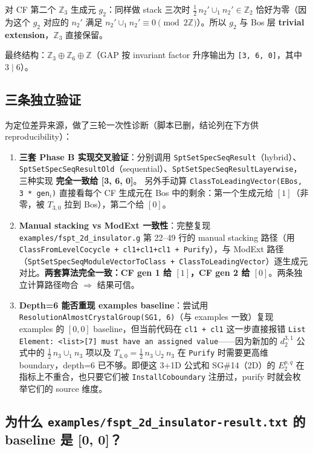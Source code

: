 \documentclass[a4paper,fontset=ubuntu,12pt]{ctexart}
\newcommand{\ZZ}{\mathbb{Z}}
\begin{document}
对 CF 第二个 $\ZZ_3$ 生成元 $g_2$：同样做 stack 三次时 $\frac{1}{2}\, n_2' \cup_1 n_2' \in \ZZ_2$ 恰好为零（因为这个 $g_2$ 对应的 $n_2'$ 满足 $n_2' \cup_1 n_2' \equiv 0 \pmod{2 \mathbb{Z}}$）。所以 $g_2$ 与 Bos 层 \textbf{trivial extension}，$\ZZ_3$ 直接保留。

最终结构：$\boxed{\ZZ_3 \oplus \ZZ_6 \oplus \ZZ}$（GAP 按 invariant factor 升序输出为 \texttt{[3, 6, 0]}，其中 $3 \mid 6$）。

\subsection{三条独立验证}

为定位差异来源，做了三轮一次性诊断（脚本已删，结论列在下方供 reproducibility）：
\begin{enumerate}
\item \textbf{三套 Phase B 实现交叉验证}：分别调用 \texttt{SptSetSpecSeqResult}（hybrid）、\texttt{SptSetSpecSeqResultOld}（sequential）、\texttt{SptSetSpecSeqResultLayerwise}，三种实现 \textbf{完全一致给 [3, 6, 0]}。
  另外手动算 \texttt{ClassToLeadingVector(EBos, 3 * gen$_i$)} 直接看每个 CF 生成元在 Bos 中的剩余：第一个生成元给 $[1]$（非零，被 $T_{3,0}$ 拉到 Bos），第二个给 $[0]$。
\item \textbf{Manual stacking vs ModExt 一致性}：完整复现 \texttt{examples/fspt\_2d\_insulator.g} 第 22--49 行的 manual stacking 路径（用 \texttt{ClassFromLevelCocycle + cl1+cl1+cl1 + Purify}），与 ModExt 路径（\texttt{SptSetSpecSeqModuleVectorToClass + ClassToLeadingVector}）逐生成元对比。\textbf{两套算法完全一致：CF gen 1 给 $[1]$，CF gen 2 给 $[0]$}。两条独立计算路径吻合 $\Rightarrow$ 结果可信。
\item \textbf{Depth=6 能否重现 examples baseline}：尝试用 \texttt{ResolutionAlmostCrystalGroup(SG1, 6)}（与 examples 一致）复现 examples 的 $[0, 0]$ baseline，但当前代码在 \texttt{cl1 + cl1} 这一步直接报错 \texttt{List Element: <list>[7] must have an assigned value}——因为新加的 $d_2^{3, 1}$ 公式中的 $\frac{1}{2}\, n_3 \cup_1 n_3$ 项以及 $T_{4,0} = \frac{1}{2}\, n_3 \cup_2 n_3$ 在 \texttt{Purify} 时需要更高维 boundary，depth=6 已不够。即便这 3+1D 公式和 SG\#14（2D）的 $E_2^{p,q}$ 在指标上不重合，也只要它们被 \texttt{InstallCoboundary} 注册过，purify 时就会枚举它们的 source 维度。
\end{enumerate}

\subsection{为什么 \texttt{examples/fspt\_2d\_insulator-result.txt} 的 baseline 是 [0, 0]？}
\end{document}
